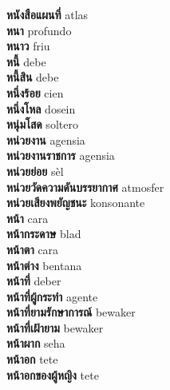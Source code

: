 \textbf{ หนังสือแผนที่  } atlas \\
\textbf{ หนา  } profundo \\
\textbf{ หนาว  } friu \\
\textbf{ หนี้  } debe \\
\textbf{ หนี้สิน  } debe \\
\textbf{ หนึ่งร้อย  } cien \\
\textbf{ หนึ่งโหล  } dosein \\
\textbf{ หนุ่มโสด  } soltero \\
\textbf{ หน่วยงาน  } agensia \\
\textbf{ หน่วยงานราชการ  } agensia \\
\textbf{ หน่วยย่อย  } sèl \\
\textbf{ หน่วยวัดความดันบรรยากาศ  } atmosfer \\
\textbf{ หน่วยเสียงพยัญชนะ  } konsonante \\
\textbf{ หน้า  } cara \\
\textbf{ หน้ากระดาษ  } blad \\
\textbf{ หน้าตา  } cara \\
\textbf{ หน้าต่าง  } bentana \\
\textbf{ หน้าที่  } deber \\
\textbf{ หน้าที่ผู้กระทำ  } agente \\
\textbf{ หน้าที่ยามรักษาการณ์  } bewaker \\
\textbf{ หน้าที่เฝ้ายาม  } bewaker \\
\textbf{ หน้าผาก  } seha \\
\textbf{ หน้าอก  } tete \\
\textbf{ หน้าอกของผู้หญิง  } tete \\

